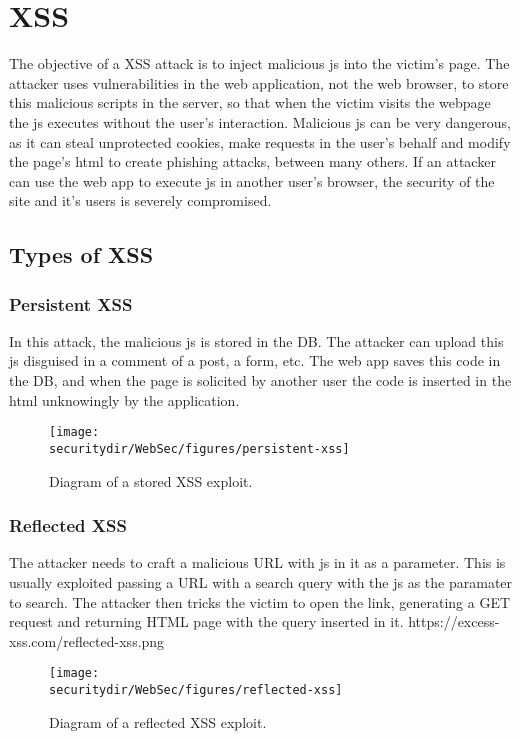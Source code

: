 \section{XSS}
The objective of a XSS attack is to inject malicious js into the victim's page. The attacker uses vulnerabilities in the web application, not the web browser, to store this malicious scripts in the server, so that when the victim visits the webpage the js executes without the user's interaction. Malicious js can be very dangerous, as it can steal unprotected cookies, make requests in the user's behalf and modify the page's html to create phishing attacks, between many others. If an attacker can use the web app to execute js in another user's browser, the security of the site and it's users is severely compromised.
\subsection{Types of XSS}
\subsubsection{Persistent XSS}
In this attack, the malicious js is stored in the DB. The attacker can upload this js disguised in a comment of a post, a form, etc. The web app saves this code in the DB, and when the page is solicited by another user the code is inserted in the html unknowingly by the application.
\begin{figure}[htb]
	\begin{centering}
		\texttt{[image: \\securitydir/WebSec/figures/persistent-xss]}
		\par\end{centering}
	\caption{\label{fig:ecb} Diagram of a stored XSS exploit.}
\end{figure}

\subsubsection{Reflected XSS}
The attacker needs to craft a malicious URL with js in it as a parameter. This is usually exploited passing a URL with a search query with the js as the paramater to search. The attacker then tricks the victim to open the link, generating a GET request and returning HTML page with the query inserted in it. https://excess-xss.com/reflected-xss.png
\begin{figure}[htb]
	\begin{centering}
		\texttt{[image: \\securitydir/WebSec/figures/reflected-xss]}
		\par\end{centering}
	\caption{\label{fig:reflexted-xss} Diagram of a reflected XSS exploit.}
\end{figure}

